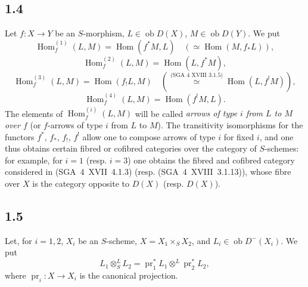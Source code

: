 \documentclass[11pt]{article}
\DeclareMathOperator{\Hom}{Hom}
\newcommand{\ob}{\operatorname{ob}}
\providecommand{\pr}{\operatorname{pr}}
\providecommand{\Hom}{\operatorname{Hom}}
\providecommand{\ob}{\operatorname{ob}}
\providecommand{\pr}{\operatorname{pr}}
\providecommand{\Hom}{\operatorname{Hom}}
\begin{document}
\subsection*{1.4}\label{sga5:III:subsection:1.4}
Let $f:X\to Y$ be an $S$-morphism, $L\in\ob D(X)$, $M\in\ob D(Y)$. We put
\[
\Hom_f^{(1)}(L,M)=\Hom(f^{*}M,L)\quad (\simeq \Hom(M,f_{*}L)),
\]
\[
\Hom_f^{(2)}(L,M)=\Hom(L,f^{*}M),
\]
\[
\Hom_f^{(3)}(L,M)=\Hom(f_{!}L,M)\quad (\overset{\text{(SGA~4~XVIII~3.1.5)}}{\simeq} \Hom(L,f^{!}M)),
\]
\[
\Hom_f^{(4)}(L,M)=\Hom(f^{!}M,L).
\]
The elements of $\Hom_f^{(i)}(L,M)$ will be called \emph{arrows of type $i$ from $L$ to $M$ over $f$} (or $f$-arrows of type $i$ from $L$ to $M$). The transitivity isomorphisms for the functors $f^{*}$, $f_{*}$, $f_{!}$, $f^{!}$ allow one to compose arrows of type $i$ for fixed $i$, and one thus obtains certain fibred or cofibred categories over the category of $S$-schemes: for example, for $i=1$ (resp. $i=3$) one obtains the fibred and cofibred category considered in (SGA~4~XVII~4.1.3) (resp. (SGA~4~XVIII~3.1.13)), whose fibre over $X$ is the category opposite to $D(X)$ (resp. $D(X)$).

\subsection*{1.5}\label{sga5:III:subsection:1.5}
Let, for $i=1,2$, $X_i$ be an $S$-scheme, $X=X_1\times_SX_2$, and $L_i\in\ob D^{-}(X_i)$. We put
\[
L_1\otimes^L_SL_2=\pr_1^{*}L_1\otimes^L\pr_2^{*}L_2,
\]
where $\pr_i:X\to X_i$ is the canonical projection.
\end{document}
